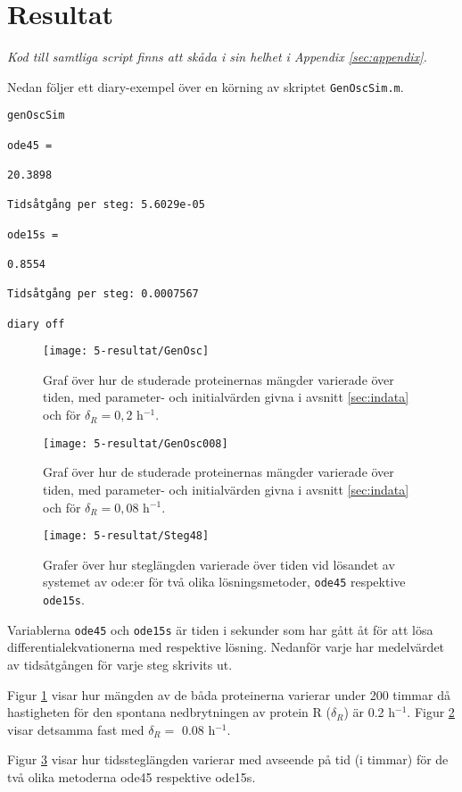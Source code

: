 \section{Resultat}
\label{sec:resultat}

\emph{Kod till samtliga script finns att skåda i sin helhet i Appendix \ref{sec:appendix}.}

Nedan följer ett diary-exempel över en körning av skriptet \texttt{GenOscSim.m}.

\begin{verbatim}
genOscSim

ode45 =

20.3898

Tidsåtgång per steg: 5.6029e-05

ode15s =

0.8554

Tidsåtgång per steg: 0.0007567

diary off
\end{verbatim}

\begin{figure}[H]
\centering
\texttt{[image: 5-resultat/GenOsc]}
\caption{Graf över hur de studerade proteinernas mängder varierade över tiden, med parameter- och initialvärden givna i avsnitt \ref{sec:indata} och för $\delta_R = 0,2$ h$^{-1}$.}
\label{fig:GenOsc}
\end{figure}

\begin{figure}[H]
	\centering
	\texttt{[image: 5-resultat/GenOsc008]}
	\caption{Graf över hur de studerade proteinernas mängder varierade över tiden, med parameter- och initialvärden givna i avsnitt \ref{sec:indata} och för $\delta_R = 0,08$ h$^{-1}$.}
	\label{fig:GenOsc008}
\end{figure}

\begin{figure}[H]
	\centering
	\texttt{[image: 5-resultat/Steg48]}
	\caption{Grafer över hur steglängden varierade över tiden vid lösandet av systemet av ode:er för två olika lösningsmetoder, \texttt{ode45} respektive \texttt{ode15s}.}
	\label{fig:Steg48}
\end{figure}

Variablerna \texttt{ode45} och \texttt{ode15s} är tiden i sekunder som har gått åt för att lösa differentialekvationerna med respektive lösning. Nedanför varje har medelvärdet av tidsåtgången för varje steg skrivits ut.

Figur \ref{fig:GenOsc} visar hur mängden av de båda proteinerna varierar under 200 timmar då hastigheten för den spontana nedbrytningen av protein R ($\delta_R$) är 0.2 h$^{-1}$. Figur \ref{fig:GenOsc008} visar detsamma fast med $\delta_R =$ 0.08 h$^{-1}$.

Figur \ref{fig:Steg48} visar hur tidssteglängden varierar med avseende på tid (i timmar) för de två olika metoderna ode45 respektive ode15s.
